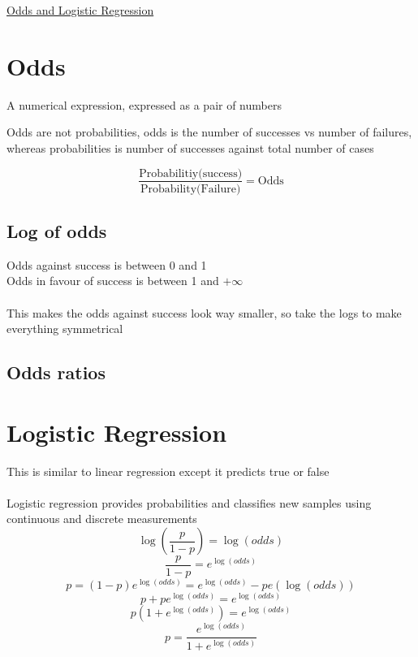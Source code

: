 \documentclass{article}[18pt]
\begin{document}
\begin{center}
\underline{\huge Odds and Logistic Regression}
\end{center}
\section{Odds}
\begin{definition}[Odds]
	A numerical expression, expressed as a pair of numbers
\end{definition}
\begin{important}
Odds are not probabilities, odds is the number of successes vs number of failures, whereas probabilities is number of successes against total number of cases
\end{important}
$$\dfrac{\text{Probabilitiy(success)}}{\text{Probability(Failure)}}=\text{Odds}$$
\subsection{Log of odds}
Odds against success is between 0 and 1\\
Odds in favour of success is between 1 and $+\infty$\\
\\
This makes the odds against success look way smaller, so take the logs to make everything symmetrical
\subsection{Odds ratios}
\section{Logistic Regression}
This is similar to linear regression except it predicts true or false\\
\\
Logistic regression provides probabilities and classifies new samples using continuous and discrete measurements
$$\log(\frac{p}{1-p})=\log(odds)$$
$$\dfrac{p}{1-p}=e^{\log(odds)}$$
$$p=(1-p)e^{\log(odds)}=e^{\log(odds)}-pe(\log(odds))$$
$$p+pe^{\log(odds)}=e^{\log(odds)}$$
$$p(1+e^{\log(odds)})=e^{\log(odds)}$$
$$p=\dfrac{e^{\log(odds)}}{1+e^{\log(odds)}}$$
\end{document}
